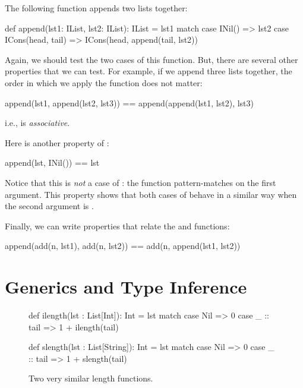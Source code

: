 \documentclass{book}
\begin{document}
The following function appends two lists together:
%
\begin{scalacode}
def append(lst1: IList, lst2: IList): IList = lst1 match {
  case INil() => lst2
  case ICons(head, tail) => ICons(head, append(tail, lst2))
}
\end{scalacode}

Again, we should test the two cases of this function. But, there are
several other properties that we can test. For example, if we append
three lists together, the order in which we apply the function
does not matter:
%
\begin{scalacode}
append(lst1, append(lst2, lst3)) == append(append(lst1, lst2), lst3)
\end{scalacode}
i.e.,  is \emph{associative}.

Here is another property of :
\begin{scalacode}
append(lst, INil()) == lst
\end{scalacode}
%
Notice that this is \emph{not} a case of : the function
pattern-matches on the first argument. This property shows that both cases
of  behave in a similar way when the second argument is
.

Finally, we can write properties that relate the  and
 functions:
%
\begin{scalacode}
append(add(n, lst1), add(n, lst2)) == add(n, append(lst1, lst2))
\end{scalacode}


\newlecture

\section{Generics and Type Inference}

\begin{figure}
\begin{minipage}{0.45\textwidth}
\begin{scalacode}
def ilength(lst : List[Int]): Int = lst match {
  case Nil => 0
  case _ :: tail => 1 + ilength(tail)
}
\end{scalacode}
\end{minipage}
\quad\vrule\quad
\begin{minipage}{0.45\textwidth}
\begin{scalacode}
def slength(lst : List[String]): Int = lst match {
  case Nil => 0
  case _ :: tail => 1 + slength(tail)
}
\end{scalacode}
\end{minipage}
\caption{Two very similar length functions.}
\label{monolength}
\end{figure}
\end{document}
